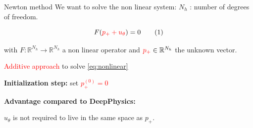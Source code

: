 \begin{frame}[noframenumbering]{Newton method}
    \vspace{5pt}
    We want to solve the non linear system: \hfill \tiny $N_h$ : number of degrees of freedom.

    \normalsize
    \vspace{-10pt}
    \begin{equation}
        F(\textcolor{red}{p_+ + u_\theta}) = 0 \tag{1}
    \end{equation}

    \vspace{-2pt}
    with $F:\mathbb{R}^{N_h} \to \mathbb{R}^{N_h}$ a non linear operator and $\textcolor{red}{p_+}\in\mathbb{R}^{N_h}$ the unknown vector.

    \begin{center}
        \small
        \begin{minipage}{0.9\linewidth}
            \begin{algorithm}[H]
                \SetAlgoLined
                \caption{\textcolor{red}{Additive approach} to solve \eqref{eq:nonlinear} }
                \textbf{Initialization step:} set \textcolor{red}{$p_+^{(0)} = 0$}\;
            \end{algorithm}
        \end{minipage}
    \end{center}

    \textbf{Advantage compared to DeepPhysics:}

    \begin{center}
    $u_\theta$ is not required to live in the same space as $p_+$.
    \end{center}
\end{frame}


